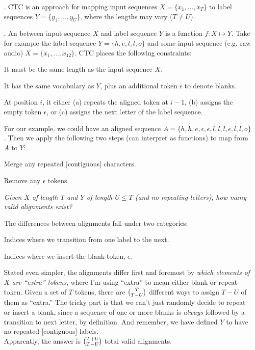 \documentclass[11pt]{article}
\begin{document}
. CTC is an approach for mapping input sequences $X = \{x_1, \ldots, x_T\}$ to label sequences $Y = \{y_1, \ldots, y_U \}$, where the lengths may vary ($T \ne U$). 


. An  between input sequence $X$ and label sequence $Y$ is a function $f: X \mapsto Y$. Take for example the label sequence $Y = \{ h, e, l, l, o\}$ and some input sequence (e.g. raw audio) $X = \{x_1, \ldots, x_{12}\}$. CTC places the following constraints:
\begin{compactenum}
	\item It must be the same length as the input sequence $X$. 
	
	\item It has the same vocabulary as $Y$, plus an additional token $\epsilon$ to denote blanks. 
	
	\item At position $i$, it either (a) repeats the aligned token at $i-1$, (b) assigns the empty token $\epsilon$, or (c) assigns the next letter of the label sequence. 
\end{compactenum} 
For our example, we could have an aligned sequence $A = \{h, h, e, \epsilon, \epsilon, l, l, l, \epsilon, l, l, o\}$. Then we apply the following two steps (can interpret as functions) to map from $A$ to $Y$:
\begin{compactenum}
	\item Merge any repeated [contiguous] characters. 
	
	\item Remove any $\epsilon$ tokens. 
\end{compactenum}

\begin{example}
	{\itshape\small Given $X$ of length $T$ and $Y$ of length $U \le T$ (and no repeating letters), how many valid alignments exist?}
	\tcblower
	
	The differences between alignments fall under two categories:
	\begin{compactenum}
		\item Indices where we transition from one label to the next. 
		\item Indices where we insert the blank token, $\epsilon$. 
	\end{compactenum}
	\vspace{1em}
	
	Stated even simpler, the alignments differ first and foremost by \textit{which elements of $X$ are ``extra'' tokens}, where I'm using ``extra'' to mean either blank or repeat token. Given a set of $T$ tokens, there are $\tbinom{T}{T - U}$ different ways to assign $T - U$ of them as ``extra.'' The tricky part is that we can't just randomly decide to repeat or insert a blank, since a sequence of one or more blanks is \textit{always} followed by a transition to next letter, by definition. And remember, we have defined $Y$ to have no repeated [contiguous] labels. \\
	
	Apparently, the answer is $\tbinom{T + U}{ T - U}$ total valid alignments. 
\end{example}
\end{document}
